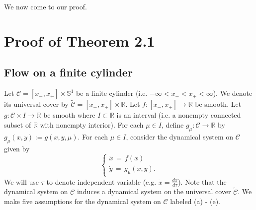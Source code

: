 \documentclass[11 pt]{article}
\renewcommand\({\left(}
\renewcommand\){\right)}
\newcommand\wt{\widetilde}
\newcommand\<{\langle}
\renewcommand\>{\rangle}
\newcommand\8{\infty}
\newcommand{\R}{\mathbb R}
\newcommand{\mc}{\mathcal}
\newcommand{\Sset}{\mathbb{S}}
\begin{document}
We now come to our proof.
\medskip
\medskip

\section{Proof of Theorem 2.1}\label{THEproof}

\subsection{Flow on a finite cylinder}\label{assumptions on flow section}

\medskip

Let $\mc{C} = [x_-, x_+] \times \Sset^1$ be a finite cylinder (i.e. $-\infty < x_- < x_+ < \infty$). We denote its universal cover by $\wt{\mc{C}} = [x_-, x_+] \times \R$. Let $f\colon [x_-, x_+] \to \R$ be smooth. Let $g \colon \mc{C} \times I \to \R$ be smooth where $I \subset \R$ is an interval (i.e. a nonempty connected subset of $\R$ with nonempty interior). For each $\mu \in I$, define $g_\mu \colon \mc{C} \to \R$ by $g_\mu(x,y) := g(x,y,\mu)$. For each $\mu \in I$, consider the dynamical system on $\mc{C}$ given by 
\[  \left\{
 \begin{array}{ll}
      \dot{x} \,=\,  f(x)   \\
      \dot{y} \,=\,  g_\mu(x,y).      
\end{array} 
\right. \]
We will use $\tau$ to denote independent variable (e.g. $\dot{x} = \frac{dx}{d \tau}$). 
Note that the dynamical system on $\mc{C}$ induces a dynamical system on the universal cover $\wt{\mc{C}}$. We make five assumptions for the dynamical system on $\mc{C}$ labeled (a) - (e). 

\medskip
\medskip


\medskip
\end{document}
